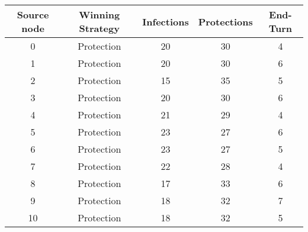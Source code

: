 \documentclass[results.tex]{subfiles}
\begin{document}
    \begin{center}
        \begin{tabular}{| c || c | c | c | c |}
            \hline
            {\bfseries Source node} & {\bfseries Winning Strategy} & {\bfseries Infections} & {\bfseries Protections}
            & {\bfseries End-Turn}
            \\  %
            \hline\hline
            0                       & Protection                   & 20                     & 30                      & 4                    \\
            \hline
            1                       & Protection                   & 20                     & 30                      & 6                    \\
            \hline
            2                       & Protection                   & 15                     & 35                      & 5                    \\
            \hline
            3                       & Protection                   & 20                     & 30                      & 6                    \\
            \hline
            4                       & Protection                   & 21                     & 29                      & 4                    \\
            \hline
            5                       & Protection                   & 23                     & 27                      & 6                    \\
            \hline
            6                       & Protection                   & 23                     & 27                      & 5                    \\
            \hline
            7                       & Protection                   & 22                     & 28                      & 4                    \\
            \hline
            8                       & Protection                   & 17                     & 33                      & 6                    \\
            \hline
            9                       & Protection                   & 18                     & 32                      & 7                    \\
            \hline
            10                      & Protection                   & 18                     & 32                      & 5                    \\

\end{tabular}
\end{center}
\end{document}
